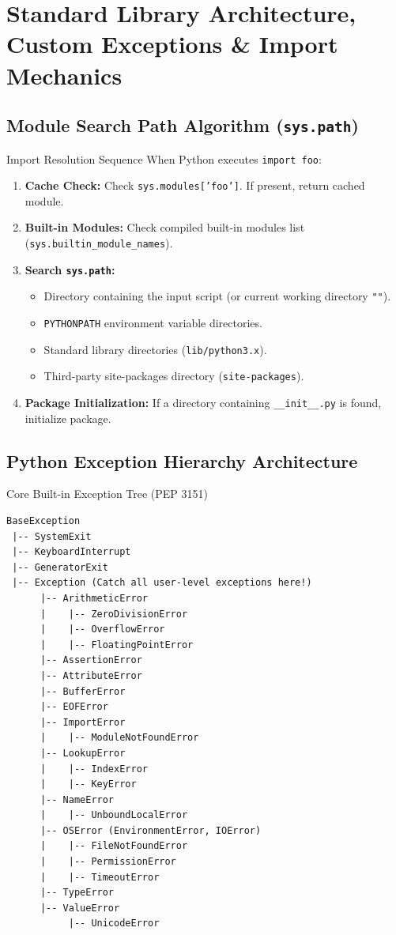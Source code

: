 \chapter{Standard Library Architecture, Custom Exceptions \& Import Mechanics}
\label{chap:modules-exceptions}

\section{Module Search Path Algorithm (\texttt{sys.path})}
\begin{formulabox}{Import Resolution Sequence}
When Python executes \texttt{import foo}:
\begin{enumerate}[leftmargin=1.5em, itemsep=2pt]
    \item \textbf{Cache Check:} Check \texttt{sys.modules['foo']}. If present, return cached module.
    \item \textbf{Built-in Modules:} Check compiled built-in modules list (\texttt{sys.builtin\_module\_names}).
    \item \textbf{Search \texttt{sys.path}:}
    \begin{itemize}[leftmargin=1em]
        \item Directory containing the input script (or current working directory \texttt{""}).
        \item \texttt{PYTHONPATH} environment variable directories.
        \item Standard library directories (\texttt{lib/python3.x}).
        \item Third-party site-packages directory (\texttt{site-packages}).
    \end{itemize}
    \item \textbf{Package Initialization:} If a directory containing \texttt{\_\_init\_\_.py} is found, initialize package.
\end{enumerate}
\end{formulabox}

\section{Python Exception Hierarchy Architecture}
\begin{formulabox}{Core Built-in Exception Tree (PEP 3151)}
\begin{lstlisting}
BaseException
 |-- SystemExit
 |-- KeyboardInterrupt
 |-- GeneratorExit
 |-- Exception (Catch all user-level exceptions here!)
      |-- ArithmeticError
      |    |-- ZeroDivisionError
      |    |-- OverflowError
      |    |-- FloatingPointError
      |-- AssertionError
      |-- AttributeError
      |-- BufferError
      |-- EOFError
      |-- ImportError
      |    |-- ModuleNotFoundError
      |-- LookupError
      |    |-- IndexError
      |    |-- KeyError
      |-- NameError
      |    |-- UnboundLocalError
      |-- OSError (EnvironmentError, IOError)
      |    |-- FileNotFoundError
      |    |-- PermissionError
      |    |-- TimeoutError
      |-- TypeError
      |-- ValueError
           |-- UnicodeError
\end{lstlisting}
\end{formulabox}

